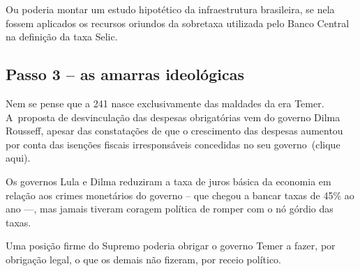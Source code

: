 Ou poderia montar um estudo hipotético da infraestrutura brasileira, se
nela fossem aplicados os recursos oriundos da sobretaxa utilizada pelo
Banco Central na definição da taxa Selic.

\subsection{Passo 3 -- as amarras ideológicas}

Nem se pense que a 241 nasce exclusivamente das maldades da era Temer. A~proposta de desvinculação das despesas obrigatórias vem do governo Dilma
Rousseff, apesar das constatações de que o crescimento das despesas
aumentou por conta das isenções fiscais irresponsáveis concedidas no seu
governo~{(clique
aqui)}.

Os governos Lula e Dilma reduziram a taxa de juros básica da economia em
relação aos crimes monetários do governo  -- que chegou a bancar
taxas de 45\% ao ano \mbox{---,} mas jamais tiveram coragem política de romper
com o nó górdio das taxas.

Uma posição firme do Supremo poderia obrigar o governo Temer a fazer,
por obrigação legal, o que os demais não fizeram, por receio político.
